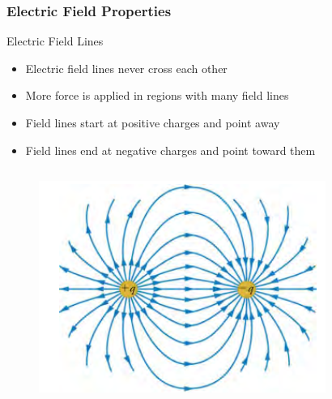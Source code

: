 \documentclass{beamer}
\begin{document}
\begin{frame}
    \frametitle{Electric Field Properties}
    \begin{block}{Electric Field Lines}
        \begin{itemize}
            \item Electric field lines never cross each other
            \item More force is applied in regions with many field lines
            \item Field lines start at positive charges and point away
            \item Field lines end at negative charges and point toward them
        \end{itemize}
    \end{block}
    
    \begin{columns}
        \begin{alertblock}{  1}
            \begin{figure}
                \centering
                \includegraphics[width=1\linewidth]{phys11-electrostatics-field-lines-opposite-charges.png}
            \end{figure}
        \end{alertblock}
        

\end{columns}
\end{frame}
\end{document}
